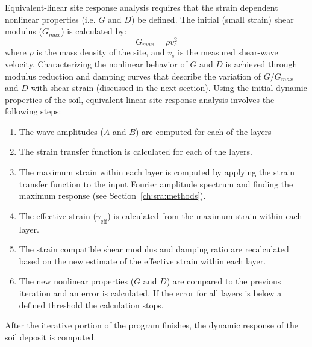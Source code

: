 \documentclass[12pt,oneside]{book}
\begin{document}
Equivalent-linear site response analysis requires that the strain dependent nonlinear properties
(i.e. $G$ and $D$) be defined.  The initial (small strain) shear modulus ($G_{max}$) is calculated by:
\begin{equation}
    G_{max} = \rho v_s ^ 2
\end{equation}
where $\rho$ is the mass density of the site, and $v_s$ is the measured shear-wave velocity.
Characterizing the nonlinear behavior of $G$ and $D$ is achieved through modulus reduction and
damping curves that describe the variation of $G/G_{max}$ and $D$ with shear strain (discussed in
the next section).  Using the initial dynamic properties of the soil, equivalent-linear site
response analysis involves the following steps:
\begin{enumerate}
    \item The wave amplitudes ($A$ and $B$) are computed for each of the layers
    \item The strain transfer function is calculated for each of the layers.
    \item The maximum strain within each layer is computed by applying the strain transfer function
        to the input Fourier amplitude spectrum and finding the maximum response (see
        Section~\ref{ch:sra:methods}).
    \item The effective strain ($\gamma_{\mathrm{eff}}$) is calculated from the maximum strain within
        each layer.
    \item The strain compatible shear modulus and damping ratio are recalculated based on the new
        estimate of the effective strain within each layer.
    \item The new nonlinear properties ($G$ and $D$) are compared to the previous iteration and an
        error is calculated.  If the error for all layers is below a defined threshold the calculation
        stops.
\end{enumerate}
After the iterative portion of the program finishes, the dynamic response of the soil deposit is
computed.


\end{document}
